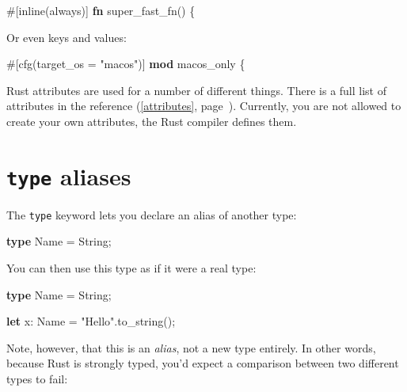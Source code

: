\documentclass[a4paper,]{book}
\renewcommand*{\hyperref}[2][\ar]{%
  \def\ar{#2}%
  #2 (\autoref{#1}, page~\pageref{#1})}
\newenvironment{Shaded}{\begin{snugshade}}{\end{snugshade}}
\newcommand{\KeywordTok}[1]{\textcolor[rgb]{0.13,0.29,0.53}{\textbf{{#1}}}}
\newcommand{\StringTok}[1]{\textcolor[rgb]{0.31,0.60,0.02}{{#1}}}
\newcommand{\OtherTok}[1]{\textcolor[rgb]{0.56,0.35,0.01}{{#1}}}
\newcommand{\NormalTok}[1]{{#1}}
\begin{document}
\begin{Shaded}
\begin{Highlighting}[]
\OtherTok{#[}\NormalTok{inline}\OtherTok{(}\NormalTok{always}\OtherTok{)]}
\KeywordTok{fn} \NormalTok{super_fast_fn() \{}
\end{Highlighting}
\end{Shaded}

Or even keys and values:

\begin{Shaded}
\begin{Highlighting}[]
\OtherTok{#[}\NormalTok{cfg}\OtherTok{(}\NormalTok{target_os }\OtherTok{=} \StringTok{"macos"}\OtherTok{)]}
\KeywordTok{mod} \NormalTok{macos_only \{}
\end{Highlighting}
\end{Shaded}

Rust attributes are used for a number of different things. There is a
full list of attributes \hyperref[attributes]{in the reference}.
Currently, you are not allowed to create your own attributes, the Rust
compiler defines them.

\section{\texorpdfstring{\texttt{type}
aliases}{type aliases}}\label{sec--type-aliases}

The \texttt{type} keyword lets you declare an alias of another type:

\begin{Shaded}
\begin{Highlighting}[]
\KeywordTok{type} \NormalTok{Name = String;}
\end{Highlighting}
\end{Shaded}

You can then use this type as if it were a real type:

\begin{Shaded}
\begin{Highlighting}[]
\KeywordTok{type} \NormalTok{Name = String;}

\KeywordTok{let} \NormalTok{x: Name = }\StringTok{"Hello"}\NormalTok{.to_string();}
\end{Highlighting}
\end{Shaded}

Note, however, that this is an \emph{alias}, not a new type entirely. In
other words, because Rust is strongly typed, you'd expect a comparison
between two different types to fail:
\end{document}
